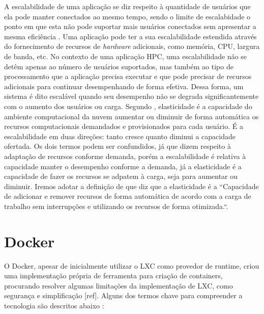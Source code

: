 \documentclass[twoside,english,brazilian]{UNISINOSmonografia}
\begin{document}
A escalabilidade de uma aplicação se diz respeito à quantidade de usuários que ela pode manter conectados ao mesmo tempo, sendo o limite de escalabidade o ponto em que esta não pode suportar mais usuários conectados sem apresentar a mesma  eficiência \cite{Wilder12}. Uma aplicação pode ter a sua escalabilidade estendida através do fornecimento de recursos de \textit{hardware} adicionais, como memória, CPU, largura de banda, etc. No contexto de uma aplicação HPC, uma escalabilidade não se detêm apenas ao número de usuários suportados, mas também ao tipo de processamento que a aplicação precisa executar e que pode precisar de recursos adicionais para continuar desempenhando de forma efetiva. Dessa forma, um sistema é dito escalável quando seu desempenho não se degrada significantemente com o aumento dos usuários ou carga.
Segundo , elasticidade é a capacidade do ambiente computacional da nuvem aumentar ou diminuir de forma automática os recursos computacionais demandados e provisionados para cada usuário. É a escalabilidade em duas direções: tanto cresce quanto diminui a capacidade ofertada. Os dois termos podem ser confundidos, já que dizem respeito à adaptação de recursos conforme demanda, porém a escalabilidade é relativa à capacidade manter o desempenho conforme a demanda, já a elasticidade é a capacidade de fazer os recursos se adpatem à carga, seja para aumentar ou diminuir. 
Iremos adotar a definição de  que diz que a elasticidade é a ``Capacidade de adicionar e remover recursos de forma automática de acordo com a carga de trabalho sem interrupções e utilizando os recursos de forma otimizada.``.

\section{Docker}
\label{docker}

O Docker, apesar de inicialmente utilizar o LXC como provedor de runtime, criou uma implementação própria de ferramenta para criação de containers, procurando resolver algumas limitações da implementação de LXC, como segurança e simplificação [ref].
Alguns dos termos chave para compreender a tecnologia são descritos abaixo \cite{whitepaperDocker2016}:  
\end{document}
